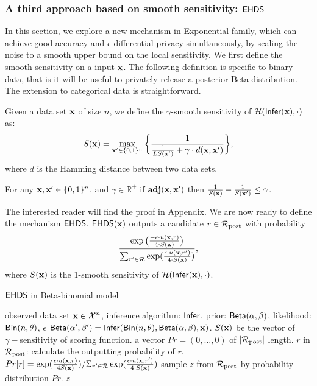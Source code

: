 \documentclass{article}
\begin{document}
\subsubsection{A third approach based on smooth sensitivity: $\mathsf{EHDS}$}
\label{subsec_hexpmech}
In this section, we explore a new mechanism in Exponential family, which can achieve good accuracy and $\epsilon$-differential privacy simultaneously,
by scaling the noise to a smooth upper bound on the local sensitivity.
We first define the smooth sensitivity on a input $\textbf{x}$. The following definition is specific to binary data, that is it will
be useful to privately release a posterior Beta distribution. The extension to categorical data is straightforward.
\begin{definition}
\label{def_gamma_smooth}
Given a data set $\textbf{x}$ of size $n$, we define the $\gamma$-smooth sensitivity of $\mathcal{H}(\mathsf{Infer}(\textbf{x}),\cdot)$ as:
\begin{equation}
  \label{eq_smooth}
   S(\textbf{x})=\max_{\textbf{x}' \in \{0,1\}^{n}}\bigg \{ \frac{1}{\frac{1}{LS(\textbf{x}')} +\gamma \cdot d(\textbf{x},\textbf{x}')} \bigg \},
\end{equation}
where $d$ is the Hamming distance between two data sets.
\end{definition}

\begin{thm}
  \label{thm_gamma_smooth}
  For any $\textbf{x}, \textbf{x}'\in\{0,1\}^n$, and $\gamma \in \mathbb{R}^{+}$
  if  $\textbf{adj}(\textbf{x},\textbf{x}')$ then $\frac{1}{S(\textbf{x})} - \frac{1}{S(\textbf{x}')} \leq \gamma$.
\end{thm}
The interested reader will find the proof in Appendix.
We are now ready to define the mechanism $\mathsf{EHDS}$. $\mathsf{EHDS}(\textbf{x})$ outputs a candidate $r \in \mathcal{R}_{\textup{post}}$ with probability
\[
  \frac {\exp\big(\frac{-\epsilon\cdot u(\textbf{x}, {r})}{4\cdot S(\textbf{x})}\big)}
  {\sum_{r' \in \mathcal{R}}\exp(\frac{\epsilon\cdot u(\textbf{x}, {r'})}{4\cdot S(\textbf{x})})},
\]
where $S(\textbf{x})$ is the 1-smooth sensitivity of  $\mathcal{H}(\mathsf{Infer}(\textbf{x}),\cdot)$. {\color{red}{why do we choose 1???}}
  \begin{algorithm}
  \caption{$\mathsf{EHDS}$ in Beta-binomial model}
  \label{mech:expmech}
  \begin{algorithmic}
  \INPUT observed data set $\textbf{x} \in \mathcal{X}^n$, inference algorithm: $\mathsf{Infer}$, 
  prior: $\mathsf{Beta}(\alpha, \beta)$, likelihood: $\mathsf{Bin}(n, \theta)$, $\epsilon$
  \STATE {} $\mathsf{Beta}(\alpha', \beta') = \mathsf{Infer}(\mathsf{Bin}(n, \theta), \mathsf{Beta}(\alpha, \beta), \textbf{x})$. $S(\textbf{x})$ be the vector of $\gamma-$sensitivity of scoring function. 
  \STATE {} a vector $Pr = (0, \dots, 0 )$ of $|\mathcal{R}_{\textup{post}}|$ length.
  \STATE {} $r$ in $\mathcal{R}_{\textup{post}}$:
  \STATE \quad \quad calculate the outputting probability of $r$.
  \STATE \quad \quad $Pr[r] = 
  {\exp(\frac{\epsilon \cdot u(\textbf{x}, {r})}{4 S(\textbf{x})})}
/ {\Sigma_{r' \in \mathcal{R}}\exp(\frac{\epsilon \cdot u(\textbf{x}, {r'})}{4 \cdot S(\textbf{x})})}$
\STATE \quad sample $z$ from $\mathcal{R}_{\textup{post}}$ by probability distribution $Pr$.
   $z$
  \end{algorithmic}
  \end{algorithm}
\end{document}
